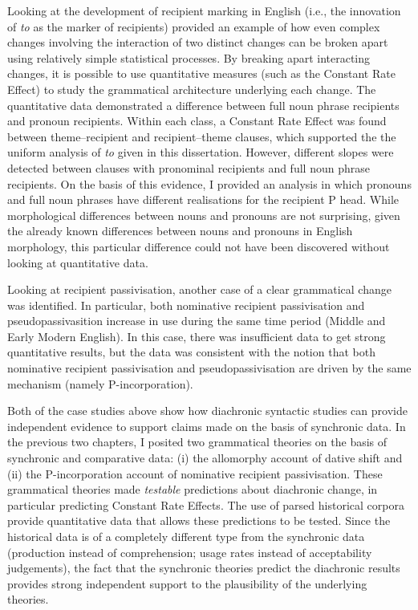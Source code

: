 	Looking at the development of recipient marking in English (i.e., the innovation of \textit{to} as the marker of recipients) provided an example of how even complex changes involving the interaction of two distinct changes can be broken apart using relatively simple statistical processes. By breaking apart interacting changes, it is possible to use quantitative measures (such as the Constant Rate Effect) to study the grammatical architecture underlying each change. The quantitative data demonstrated a difference between full noun phrase recipients and pronoun recipients. Within each class, a Constant Rate Effect was found between theme--recipient and recipient--theme clauses, which supported the the uniform analysis of \textit{to} given in this dissertation. However, different slopes were detected between clauses with pronominal recipients and full noun phrase recipients. On the basis of this evidence, I provided an analysis in which pronouns and full noun phrases have different realisations for the recipient P head. While morphological differences between nouns and pronouns are not surprising, given the already known differences between nouns and pronouns in English morphology, this particular difference could not have been discovered without looking at quantitative data.
	
	Looking at recipient passivisation, another case of a clear grammatical change was identified. In particular, both nominative recipient passivisation and pseudopassivasition increase in use during the same time period (Middle and Early Modern English). In this case, there was insufficient data to get strong quantitative results, but the data was consistent with the notion that both nominative recipient passivisation and pseudopassivisation are driven by the same mechanism (namely P-incorporation).

	Both of the case studies above show how diachronic syntactic studies can provide independent evidence to support claims made on the basis of synchronic data. In the previous two chapters, I posited two grammatical theories on the basis of synchronic and comparative data: (i) the allomorphy account of dative shift and (ii) the P-incorporation account of nominative recipient passivisation. These grammatical theories made \textit{testable} predictions about diachronic change, in particular predicting Constant Rate Effects. The use of parsed historical corpora provide quantitative data that allows these predictions to be tested. Since the historical data is of a completely different type from the synchronic data (production instead of comprehension; usage rates instead of acceptability judgements), the fact that the synchronic theories predict the diachronic results provides strong independent support to the plausibility of the underlying theories.


